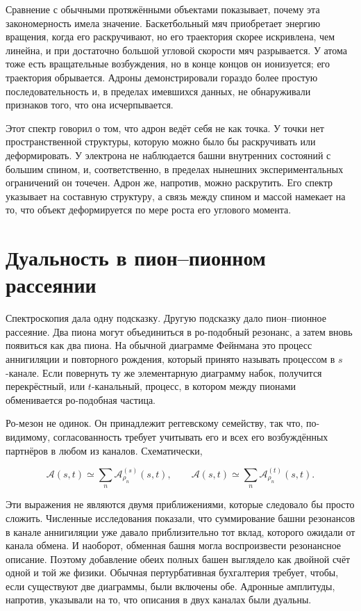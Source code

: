 Сравнение с обычными протяжёнными объектами показывает, почему эта закономерность имела значение.
Баскетбольный мяч приобретает энергию вращения, когда его раскручивают, но его траектория
скорее искривлена, чем линейна, и при достаточно большой угловой скорости мяч
разрывается. У атома тоже есть вращательные возбуждения, но в конце концов он
ионизуется; его траектория обрывается. Адроны демонстрировали гораздо более простую последовательность и,
в пределах имевшихся данных, не обнаруживали признаков того, что она исчерпывается.

Этот спектр говорил о том, что адрон ведёт себя не как точка. У точки нет
пространственной структуры, которую можно было бы раскручивать или деформировать. У электрона
не наблюдается башни внутренних состояний с большим спином, и, соответственно,
в пределах нынешних экспериментальных ограничений он точечен. Адрон же, напротив,
можно раскрутить. Его спектр указывает на составную структуру, а связь между
спином и массой намекает на то, что объект деформируется по мере роста его
углового момента.

\section{Дуальность в пион--пионном рассеянии}

Спектроскопия дала одну подсказку. Другую подсказку дало пион--пионное рассеяние. Два
пиона могут объединиться в ро-подобный резонанс, а затем вновь появиться как два
пиона. На обычной диаграмме Фейнмана это процесс аннигиляции и
повторного рождения, который принято называть процессом в \(s\)-канале. Если повернуть ту
же элементарную диаграмму набок, получится перекрёстный, или \(t\)-канальный, процесс,
в котором между пионами обменивается ро-подобная частица.

Ро-мезон не одинок. Он принадлежит реггевскому семейству, так что, по-видимому,
согласованность требует учитывать его и всех его возбуждённых партнёров в любом из
каналов. Схематически,

\begin{equation}
  \mathcal A(s,t)\simeq
  \sum_n \mathcal A^{(s)}_{\rho_n}(s,t),
  \qquad
  \mathcal A(s,t)\simeq
  \sum_n \mathcal A^{(t)}_{\rho_n}(s,t).
  \label{eq:l01-channel-sums}
\end{equation}

Эти выражения не являются двумя приближениями, которые следовало бы просто сложить.
Численные исследования показали, что суммирование башни резонансов в
канале аннигиляции уже давало приблизительно тот вклад, которого ожидали
от канала обмена. И наоборот, обменная башня могла воспроизвести
резонансное описание. Поэтому добавление обеих полных башен выглядело как
двойной счёт одной и той же физики. Обычная пертурбативная бухгалтерия требует,
чтобы, если существуют две диаграммы, были включены обе. Адронные амплитуды, напротив,
указывали на то, что описания в двух каналах были дуальны.

